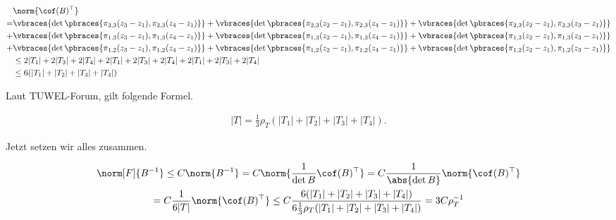 \begin{solution}
\begin{align*}
  & \norm{\cof(B)^\top} \\
  =
  & \vbraces
  {
    \det
    \pbraces
    {
      \pi_{2, 3}(z_3 - z_1),
      \pi_{2, 3}(z_4 - z_1)
    }
  }
  +
  \vbraces
  {
    \det
    \pbraces
    {
      \pi_{2, 3}(z_2 - z_1),
      \pi_{2, 3}(z_4 - z_1)
    }
  }
  +
  \vbraces
  {
    \det
    \pbraces
    {
      \pi_{2, 3}(z_2 - z_1),
      \pi_{2, 3}(z_3 - z_1)
    }
  } \\
  +
  & \vbraces
  {
    \det
    \pbraces
    {
      \pi_{1, 3}(z_3 - z_1),
      \pi_{1, 3}(z_4 - z_1)
    }
  }
  +
  \vbraces
  {
    \det
    \pbraces
    {
      \pi_{1, 3}(z_2 - z_1),
      \pi_{1, 3}(z_4 - z_1)
    }
  }
  +
  \vbraces
  {
    \det
    \pbraces
    {
      \pi_{1, 3}(z_2 - z_1),
      \pi_{1, 3}(z_3 - z_1)
    }
  } \\
  +
  & \vbraces
  {
    \det
    \pbraces
    {
      \pi_{1, 2}(z_3 - z_1),
      \pi_{1, 2}(z_4 - z_1)
    }
  }
  +
  \vbraces
  {
    \det
    \pbraces
    {
      \pi_{1, 2}(z_2 - z_1),
      \pi_{1, 2}(z_4 - z_1)
    }
  }
  +
  \vbraces
  {
    \det
    \pbraces
    {
      \pi_{1, 2}(z_2 - z_1),
      \pi_{1, 2}(z_3 - z_1)
    }
  } \\
  & \leq
  2 |T_1| + 2 |T_3| + 2 |T_4| +
  2 |T_1| + 2 |T_3| + 2 |T_4| +
  2 |T_1| + 2 |T_3| + 2 |T_4| \\
  & \leq
  6 (|T_1| + |T_2| + |T_3| + |T_4|)
\end{align*}

Laut TUWEL-Forum, gilt folgende Formel.

\begin{align*}
  |T|
  =
  \frac{1}{3} \rho_T (|T_1| + |T_2| + |T_3| + |T_4|).
\end{align*}

Jetzt setzen wir alles zusammen.

\begin{multline*}
  \norm[F]{B^{-1}}
  \leq
  C \norm{B^{-1}}
  =
  C
  \norm
  {
    \frac{1}{\det B}
    \cof(B)^\top
  }
  =
  C
  \frac{1}{\abs{\det B}}
  \norm{\cof(B)^\top} \\
  =
  C
  \frac{1}{6 |T|}
  \norm{\cof(B)^\top}
  \leq
  C
  \frac
  {
    6 (|T_1| + |T_2| + |T_3| + |T_4|)
  }{
    6 \frac{1}{3} \rho_T (|T_1| + |T_2| + |T_3| + |T_4|)
  }
  =
  3 C \rho_T^{-1}
\end{multline*}

\end{solution}

